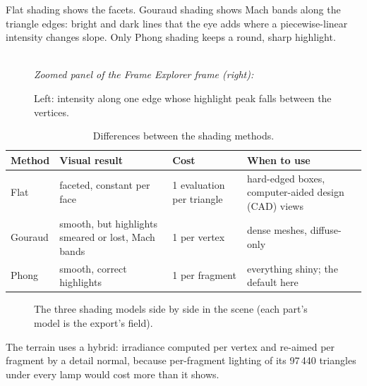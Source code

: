 Flat shading shows the facets. Gouraud shading shows Mach bands along the triangle edges: bright and dark lines that
the eye adds where a piecewise-linear intensity changes slope. Only Phong shading keeps a round, sharp highlight.

\begin{figure}[htbp]
\centering
\begin{minipage}{0.5\linewidth}\centering{}\end{minipage}\hfill
\begin{minipage}{0.48\linewidth}\centering{}\end{minipage}\\[1mm]
{\footnotesize\textit{Zoomed panel of the Frame Explorer frame (right):}}\\[0.5mm]
\feInterpGouraudPhongInfo
\caption{Left: intensity along one edge whose highlight peak falls between the vertices.}
\label{fig:gp}
\end{figure}

\begin{table}[htbp]
\caption{Differences between the shading methods.}
\centering\small
\begin{tabularx}{\linewidth}{@{}lXll@{}}
\toprule
Method & Visual result & Cost & When to use\\\midrule
Flat & faceted, constant per face & 1 evaluation per triangle & hard-edged boxes, computer-aided design (CAD) views\\
Gouraud & smooth, but highlights smeared or lost, Mach bands & 1 per vertex & dense meshes, diffuse-only\\
Phong & smooth, correct highlights & 1 per fragment & everything shiny; the default here\\
\bottomrule
\end{tabularx}
\end{table}

\begin{figure}[htbp]
\centering
{}
\caption{The three shading models side by side in the scene (each part's model is the export's  field).}
\label{fig:shade-scene}
\end{figure}

The terrain uses a hybrid: irradiance computed per vertex and re-aimed per fragment by a detail normal, because
per-fragment lighting of its 97\,440 triangles under every lamp would cost more than it shows.
